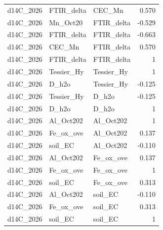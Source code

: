 \documentclass[preprint,12pt]{elsarticle}
\begin{document}
\begin{table}[htbp]
{\begin{tabular}{lllr}
d14C\_2026 & FTIR\_delta & CEC\_Mn & 0.570 \\
d14C\_2026 & Mn\_Oct20 & FTIR\_delta & -0.529 \\
d14C\_2026 & FTIR\_delta & FTIR\_delta & -0.663 \\
d14C\_2026 & CEC\_Mn & FTIR\_delta & 0.570 \\
d14C\_2026 & FTIR\_delta & FTIR\_delta & 1 \\
d14C\_2026 & Tessier\_Hy & Tessier\_Hy & 1 \\
d14C\_2026 & D\_h2o & Tessier\_Hy & -0.125 \\
d14C\_2026 & Tessier\_Hy & D\_h2o & -0.125 \\
d14C\_2026 & D\_h2o & D\_h2o & 1 \\
d14C\_2026 & Al\_Oct202 & Al\_Oct202 & 1 \\
d14C\_2026 & Fe\_ox\_ove & Al\_Oct202 & 0.137 \\
d14C\_2026 & soil\_EC & Al\_Oct202 & -0.110 \\
d14C\_2026 & Al\_Oct202 & Fe\_ox\_ove & 0.137 \\
d14C\_2026 & Fe\_ox\_ove & Fe\_ox\_ove & 1 \\
d14C\_2026 & soil\_EC & Fe\_ox\_ove & 0.313 \\
d14C\_2026 & Al\_Oct202 & soil\_EC & -0.110 \\
d14C\_2026 & Fe\_ox\_ove & soil\_EC & 0.313 \\
d14C\_2026 & soil\_EC & soil\_EC & 1 \\
\bottomrule
\end{tabular}}
\end{table}

\clearpage
  
\end{document}
